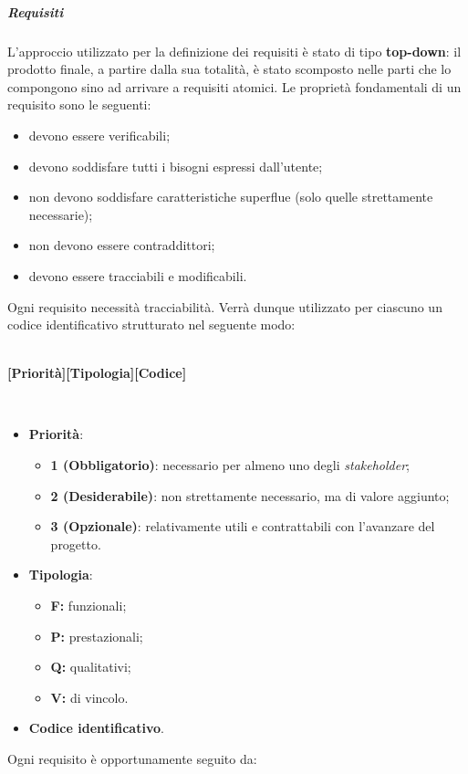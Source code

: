 \subparagraph*{Requisiti}
L'approccio utilizzato per la definizione dei requisiti è stato di tipo \textbf{top-down}: il prodotto finale, a partire dalla sua totalità, è stato scomposto nelle parti che lo compongono sino ad arrivare a requisiti atomici. Le proprietà fondamentali di un requisito sono le seguenti:
\begin{itemize}
	\item devono essere verificabili;
	\item devono soddisfare tutti i bisogni espressi dall'utente;
	\item non devono soddisfare caratteristiche superflue (solo quelle strettamente necessarie);
	\item non devono essere contraddittori;
	\item devono essere tracciabili e modificabili.
\end{itemize}
\noindent Ogni requisito necessità tracciabilità. Verrà dunque utilizzato per ciascuno un codice identificativo strutturato nel seguente modo:
\\\\
\centerline{\textbf{[Priorità][Tipologia][Codice]}}\\
\begin{itemize}
  \item \textbf{Priorità}:
  \begin{itemize}
    \item \textbf{1 (Obbligatorio)}: necessario per almeno uno degli \textit{stakeholder\glos};
    \item \textbf{2 (Desiderabile)}: non strettamente necessario, ma di valore aggiunto;
    \item \textbf{3 (Opzionale)}: relativamente utili e contrattabili con l'avanzare del progetto.
  \end{itemize}
  \item \textbf{Tipologia}:
  \begin{itemize}
    \item \textbf{F:} funzionali;
    \item \textbf{P:} prestazionali;
    \item \textbf{Q:} qualitativi;
    \item \textbf{V:} di vincolo.
  \end{itemize}
  \item \textbf{Codice identificativo}.
\end{itemize}
Ogni requisito è opportunamente seguito da:
